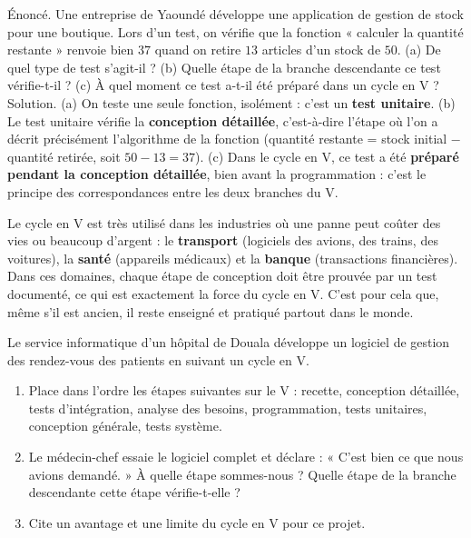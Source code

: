 \documentclass[11pt]{article}
\begin{document}
\begin{exoresolu}
Énoncé. Une entreprise de Yaoundé développe une application de gestion de stock pour une boutique. Lors d'un test, on vérifie que la fonction « calculer la quantité restante » renvoie bien $37$ quand on retire $13$ articles d'un stock de $50$. (a) De quel type de test s'agit-il ? (b) Quelle étape de la branche descendante ce test vérifie-t-il ? (c) À quel moment ce test a-t-il été préparé dans un cycle en V ?
\tcblower
Solution. (a) On teste une seule fonction, isolément : c'est un \textbf{test unitaire}. (b) Le test unitaire vérifie la \textbf{conception détaillée}, c'est-à-dire l'étape où l'on a décrit précisément l'algorithme de la fonction (quantité restante = stock initial $-$ quantité retirée, soit $50 - 13 = 37$). (c) Dans le cycle en V, ce test a été \textbf{préparé pendant la conception détaillée}, bien avant la programmation : c'est le principe des correspondances entre les deux branches du V.
\end{exoresolu}

\begin{savaistu}
Le cycle en V est très utilisé dans les industries où une panne peut coûter des vies ou beaucoup d'argent : le \textbf{transport} (logiciels des avions, des trains, des voitures), la \textbf{santé} (appareils médicaux) et la \textbf{banque} (transactions financières). Dans ces domaines, chaque étape de conception doit être prouvée par un test documenté, ce qui est exactement la force du cycle en V. C'est pour cela que, même s'il est ancien, il reste enseigné et pratiqué partout dans le monde.
\end{savaistu}

\begin{exercice}
Le service informatique d'un hôpital de Douala développe un logiciel de gestion des rendez-vous des patients en suivant un cycle en V.
\begin{enumerate}
\item Place dans l'ordre les étapes suivantes sur le V : recette, conception détaillée, tests d'intégration, analyse des besoins, programmation, tests unitaires, conception générale, tests système.
\item Le médecin-chef essaie le logiciel complet et déclare : « C'est bien ce que nous avions demandé. » À quelle étape sommes-nous ? Quelle étape de la branche descendante cette étape vérifie-t-elle ?
\item Cite un avantage et une limite du cycle en V pour ce projet.
\end{enumerate}
\end{exercice}
\end{document}
